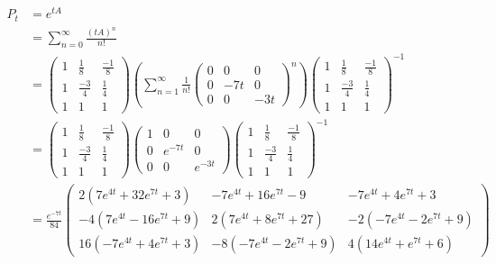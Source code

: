 \documentclass[11pt]{article}
\begin{document}
\begin{enumerate}
\begin{solution}
    \begin{align*}
        P_t &= e^{tA}\\
        &= \sum_{n=0}^\infty \frac{(tA)^n}{n!}\\
        &= \begin{pmatrix}
            1 & \frac{1}{8} & \frac{-1}{8}\\
            1 & \frac{-3}{4} & \frac{1}{4}\\
            1 & 1 & 1
        \end{pmatrix}\left(\sum_{n=1}^\infty \frac{1}{n!}\begin{pmatrix}
            0 & 0 & 0\\
            0 & -7t & 0\\
            0 & 0 &-3t
        \end{pmatrix}^n\right) \begin{pmatrix}
            1 & \frac{1}{8} & \frac{-1}{8}\\
            1 & \frac{-3}{4} & \frac{1}{4}\\
            1 & 1 & 1
        \end{pmatrix}^{-1}\\
        &= \begin{pmatrix}
            1 & \frac{1}{8} & \frac{-1}{8}\\
            1 & \frac{-3}{4} & \frac{1}{4}\\
            1 & 1 & 1
        \end{pmatrix}\begin{pmatrix}
            1 & 0 & 0\\
            0 & e^{-7t} & 0\\
            0 & 0 &e^{-3t}
        \end{pmatrix}\begin{pmatrix}
            1 & \frac{1}{8} & \frac{-1}{8}\\
            1 & \frac{-3}{4} & \frac{1}{4}\\
            1 & 1 & 1
        \end{pmatrix}^{-1}\\
        &= \frac{e^{-7t}}{84}
\begin{pmatrix}
2\left(7 e^{4t} + 32 e^{7t} + 3\right) & -7 e^{4t} + 16 e^{7t} - 9 & -7 e^{4t} + 4 e^{7t} + 3 \\
-4\left(7 e^{4t} - 16 e^{7t} + 9\right) & 2\left(7 e^{4t} + 8 e^{7t} + 27\right) & -2\left(-7 e^{4t} - 2 e^{7t} + 9\right) \\
16\left(-7 e^{4t} + 4 e^{7t} + 3\right) & -8\left(-7 e^{4t} - 2 e^{7t} + 9\right) & 4\left(14 e^{4t} + e^{7t} + 6\right)

\end{pmatrix}
\end{align*}
\end{solution}
\end{enumerate}
\end{document}

